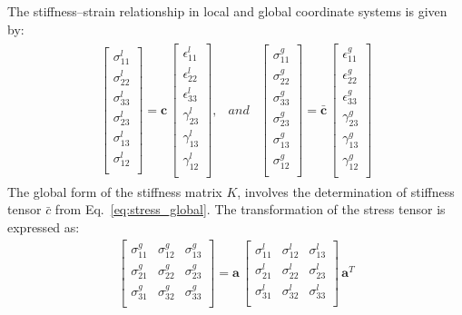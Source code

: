 \documentclass[materials,article,submit,moreauthors,pdftex]{Definitions/mdpi}
\begin{document}
The stiffness--strain relationship in local and global coordinate systems is given by:
\begin{eqnarray}
\begin{array}{ccc}
\left [
\begin{array}{c}
\sigma^l_{11}\\
\sigma^l_{22}\\ 
\sigma^l_{33}\\ 
\sigma^l_{23}\\
\sigma^l_{13}\\
\sigma^l_{12}\\
\end{array}
\right ]=
\textbf{c}\,\left [
\begin{array}{c}
\epsilon^l_{11}\\
\epsilon^l_{22}\\ 
\epsilon^l_{33}\\
\gamma^l_{23}\\
\gamma^l_{13}\\
\gamma^l_{12}\\
\end{array}
\right ], & and &
\left [
\begin{array}{c}
\sigma^g_{11}\\
\sigma^g_{22}\\ 
\sigma^g_{33}\\ 
\sigma^g_{23}\\
\sigma^g_{13}\\
\sigma^g_{12}\\
\end{array}
\right ]=
\bar{\textbf{c}}\,\left [
\begin{array}{c}
\epsilon^g_{11}\\
\epsilon^g_{22}\\ 
\epsilon^g_{33}\\
\gamma^g_{23}\\
\gamma^g_{13}\\
\gamma^g_{12}\\
\end{array}
\right ]
\end{array}
\label{eq:stress_global}
\end{eqnarray}
The global form of the stiffness matrix \(K\), involves the determination of stiffness tensor \(\bar{c}\) from Eq.~\ref{eq:stress_global}.
The transformation of the stress tensor is expressed as:
\begin{eqnarray}
\left [ 
\begin{array}{ccc}
\sigma^g_{11} & \sigma^g_{12} & \sigma^g_{13}\\
\sigma^g_{21} & \sigma^g_{22} & \sigma^g_{23}\\
\sigma^g_{31} & \sigma^g_{32} & \sigma^g_{33}\\
\end{array}
\right ]
=
\textbf{a}\,
\left [ 
\begin{array}{ccc}
\sigma^l_{11} & \sigma^l_{12} & \sigma^l_{13}\\
\sigma^l_{21} & \sigma^l_{22} & \sigma^l_{23}\\
\sigma^l_{31} & \sigma^l_{32} & \sigma^l_{33}\\
\end{array}
\right ]
\,\textbf{a}^T
\label{eq:sigma_tensor}
\end{eqnarray}
\end{document}
